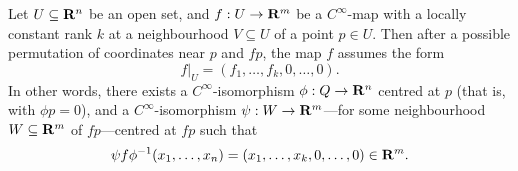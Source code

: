 \begin{theorem}
    \label{thm:constant-rank-theorem}
    Let \(U \subseteq \mathbf{R}^n\) be an open set, and \(f: U \to \mathbf{R}^m\) be a
    \(C^{\infty}\)-map with a locally constant rank \(k\) at a neighbourhood
    \(V \subseteq U\) of a point \(p \in U\). Then after a possible permutation of
    coordinates near \(p\) and \(f p\), the map \(f\) assumes the form
    \[
        f|_U  = (f_1, \dots, f_k, 0, \dots, 0).
    \]
    In other words, there exists a \(C^{\infty}\)-isomorphism \(\phi: Q \to \mathbf{R}^n\)
    centred at \(p\) (that is, with \(\phi p = 0\)), and a
    \(C^{\infty}\)-isomorphism \(\psi: W \to \mathbf{R}^m\)---for some neighbourhood
    \(W \subseteq \mathbf{R}^m\) of \(f p\)---centred at \(f p\) such that
    \begin{equation}\label{eq:const-rnk-thm}
        \psi f \phi^{-1}(x_1, \dots, x_n) = (x_1, \dots, x_k, 0, \dots, 0) \in \mathbf{R}^m.
    \end{equation}
\end{theorem}

